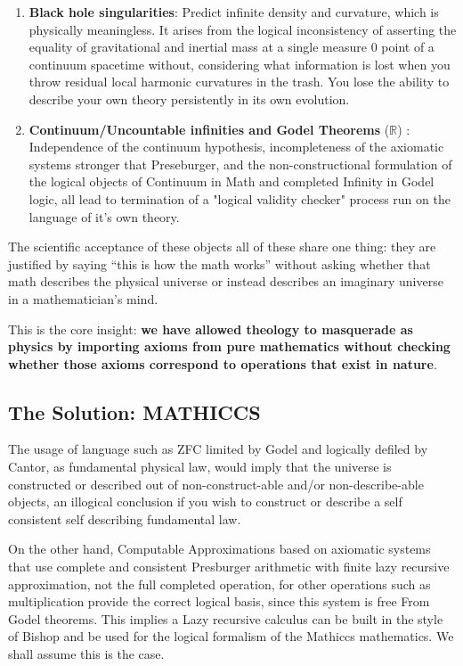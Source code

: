 \documentclass[11pt,a4paper]{article}
\begin{document}
\begin{enumerate}
  \item \textbf{Black hole singularities}: Predict infinite density and curvature, which is physically meaningless. It arises from the logical inconsistency of asserting the equality of gravitational and inertial mass at a single measure 0 point of a continuum spacetime without, considering what information is lost when you throw residual local harmonic curvatures in the trash. You lose the ability to describe your own theory persistently in its own evolution. 

  \item \textbf{Continuum/Uncountable infinities and Godel Theorems} ($\mathbb{R}$) : Independence of the continuum hypothesis, incompleteness of the axiomatic systems stronger that Preseburger, and the non-constructional formulation of the logical objects of Continuum in Math and completed Infinity in Godel logic, all lead to termination of a "logical validity checker" process run on the language of it's own theory. 


  \end{enumerate}

  The scientific acceptance of these objects all of these share one thing: they are justified by saying ``this is how the math works'' without asking whether that math describes the physical universe or instead describes an imaginary universe in a mathematician's mind.

  This is the core insight: \textbf{we have allowed theology to masquerade as physics by importing axioms from pure mathematics without checking whether those axioms correspond to operations that exist in nature}.

  \subsection{The Solution: MATHICCS}

  The usage of language such as ZFC limited by Godel and logically defiled by Cantor, as fundamental physical law, would imply that the universe is constructed or described out of non-construct-able and/or non-describe-able objects, an illogical conclusion if you wish to construct or describe a self consistent self describing fundamental law.

  On the other hand, Computable Approximations based on axiomatic systems that use complete and consistent Presburger arithmetic with finite lazy recursive approximation, not the full completed operation, for other operations such as multiplication provide the correct logical basis, since this system is free From Godel theorems. This implies a Lazy recursive calculus can be built in the style of Bishop and be used for the logical formalism of the Mathiccs mathematics. We shall assume this is the case.
\end{document}
